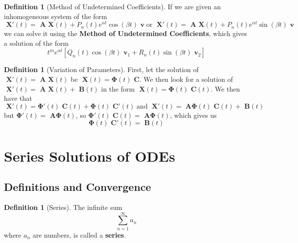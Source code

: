 \documentclass[12pt]{article}
\theoremstyle{definition}
\newtheorem{defn}[thm]{Definition}
\theoremstyle{remark}
\numberwithin{equation}{section}
\newcommand\B[1]{\textbf{ #1}}
\begin{document}
\vspace{1cm}


\begin{defn}[Method of Undetermined Coefficients]
        If we are given an inhomogeneous system of the form \begin{equation}
                \B{X}'(t) = \B{A}\B{X}(t) + P_n(t)e^{\alpha t}\cos(\beta t)\B{v}\;\text{or}\;\B{X}'(t) = \B{A}\B{X}(t) + P_n(t)e^{\alpha t}\sin(\beta t)\B{v}
        \end{equation}
        we can solve it using the \B{Method of Undetermined Coefficients}, which gives a solution of the form \begin{equation}
                t^me^{\alpha t}[Q_n(t)\cos(\beta t)\B{v}_1 + R_n(t)\sin(\beta t)\B{v}_2]
        \end{equation}
\end{defn}

\vspace{1cm}


\begin{defn}[Variation of Parameters]
        First, let the solution of $\B{X}'(t) = \B{A}\B{X}(t)$ be $\B{X}(t) = \boldsymbol{\Phi}(t)\B{C}$. We then look for a solution of $\B{X}'(t) = \B{A}\B{X}(t) + \B{B}(t)$ in the form $\B{X}(t) = \boldsymbol{\Phi}(t)\B{C}(t)$. We then have that $$\B{X}'(t) = \boldsymbol{\Phi}'(t)\B{C}(t) + \boldsymbol{\Phi}(t)\B{C}'(t)\;\text{and}\;\B{X}'(t) = \B{A}\boldsymbol{\Phi}(t)\B{C}(t)+\B{B}(t)$$ but $\boldsymbol{\Phi}'(t) = \B{A}\boldsymbol{\Phi}(t)$, so $\boldsymbol{\Phi}'(t)\B{C}(t) = \B{A}\boldsymbol{\Phi}(t)$, which gives us \begin{equation}
                \boldsymbol{\Phi}(t)\B{C}'(t) = \B{B}(t)
        \end{equation}
\end{defn}







\clearpage

\section{Series Solutions of ODEs}


\subsection{Definitions and Convergence}

\begin{defn}[Series]
        The infinite sum \begin{equation}
                \sum\limits_{n=1}^{\infty}a_n
        \end{equation}
        where $a_n$ are numbers, is called a \B{series}.
\end{defn}
\end{document}
